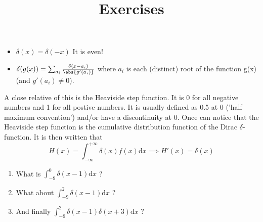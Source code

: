 \begin{itemize}
\item \begin{math}\delta(x) = \delta(-x) \end{math} It is even!
\item  \begin{math} \delta(g(x)) =\sum_{a_{i}} \frac{\delta(x-a_{i})}{\abs{g'(a_{i})}}\end{math} where $a_{i}$ is each (distinct) root of the function g(x) (and $g'(a_{i})\neq0$).
\end{itemize}
A close relative of this is the Heaviside step function. It is 0 for all negative numbers and 1 for all postive numbers. It is usually defined as 0.5 at 0 ('half maximum convention') and/or have a discontinuity at 0. Once can notice that the Heaviside step function is the cumulative distribution function of the Dirac $\delta$-function. It is then written that
\begin{equation}
H(x) = \int_{-\infty}^{+\infty} \! \delta(x)f(x) \textrm{d}x \implies H'(x) = \delta(x)
\end{equation}\par 
\title{\large{Exercises}}
\begin{enumerate}
\item What is \begin{math} \int_{-9}^{0} \! \delta(x-1) \textrm{d}x \end{math} ?
\item What about \begin{math} \int_{-9}^{2} \! \delta(x-1)  \textrm{d}x \end{math} ?
\item And finally  \begin{math} \int_{-9}^{2} \! \delta(x-1)\delta(x+3) \textrm{d}x \end{math} ?
\end{enumerate}
